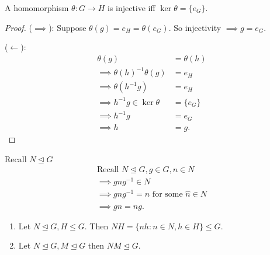 \begin{lemma}
\protect\hypertarget{lem:thirteen}{}\label{lem:thirteen}A homomorphism \(\theta : G \to H\) is injective iff \(\ker \theta = \{ e_G \}\).
\end{lemma}

\begin{proof}
(\(\implies\)): Suppose \(\theta(g) = e_H = \theta (e_G)\).
So injectivity \(\implies g = e_G\).

(\(\longleftarrow\)): \begin{align*}
    \theta(g) &= \theta(h) \\
    \implies \theta(h)^{-1} \theta(g) &= e_H \\
    \implies \theta(h^{-1} g) &= e_H \\
    \implies h^{-1} g \in \ker \theta &= \{ e_G \} \\
    \implies h^{-1} g &= e_G \\
    \implies h &= g.
\end{align*}
\end{proof}

Recall \(N \trianglelefteq G\)
\begin{align*}
    \text{Recall } N \trianglelefteq G, g \in G, n \in N \\
    \implies gng^{-1} \in N \\
    \implies gng^{-1} = \hat{n} \text{ for some } \hat{n} \in N \\
    \implies gn = \hat{n} g.
\end{align*}

\begin{lemma}
\protect\hypertarget{lem:fourteen}{}\label{lem:fourteen}

\begin{enumerate}
\def\labelenumi{\roman{enumi}.}
\item
  Let \(N \trianglelefteq G, H \leq G\).
  Then \(NH = \{ nh : n \in N, h \in H \} \leq G\).
\item
  Let \(N \trianglelefteq G, M \trianglelefteq G\) then \(NM \trianglelefteq G\).
\end{enumerate}

\end{lemma}

